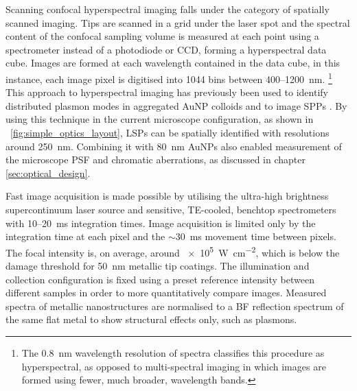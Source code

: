 \documentclass{article}
\begin{document}
Scanning confocal hyperspectral imaging falls under the category of spatially scanned imaging. Tips are scanned in a grid under the laser spot and the spectral content of the confocal sampling volume is measured at each point using a spectrometer instead of a photodiode or CCD, forming a hyperspectral data cube. Images are formed at each wavelength contained in the data cube, in this instance, each image pixel is digitised into 1044 bins between 400--\SI{1200}{nm}.%
\footnote{The \SI{0.8}{nm} wavelength resolution of spectra classifies this procedure as hyperspectral, as opposed to multi-spectral imaging in which images are formed using fewer, much broader, wavelength bands.}
This approach to hyperspectral imaging has previously been used to identify distributed plasmon modes in aggregated AuNP colloids \cite{herrmann2013} and to image SPPs \cite{bashevoy2007hyperspectral}. By using this technique in the current microscope configuration, as shown in \figurename~\ref{fig:simple_optics_layout}, LSPs can be spatially identified with resolutions around \SI{250}{nm}. Combining it with \SI{80}{nm} AuNPs also enabled measurement of the microscope PSF and chromatic aberrations, as discussed in chapter \ref{sec:optical_design}.

Fast image acquisition is made possible by utilising the ultra-high brightness supercontinuum laser source and sensitive, TE-cooled, benchtop spectrometers with 10--\SI{20}{ms} integration times. Image acquisition is limited only by the integration time at each pixel and the $\sim$\SI{30}{ms} movement time between pixels. The focal intensity is, on average, around \SI{e5}{\watt\per\centi\metre\squared}, which is below the damage threshold for \SI{50}{nm} metallic tip coatings. The illumination and collection configuration is fixed using a preset reference intensity between different samples in order to more quantitatively compare images. Measured spectra of metallic nanostructures are normalised to a BF reflection spectrum of the same flat metal to show structural effects only, such as plasmons. %
\end{document}

